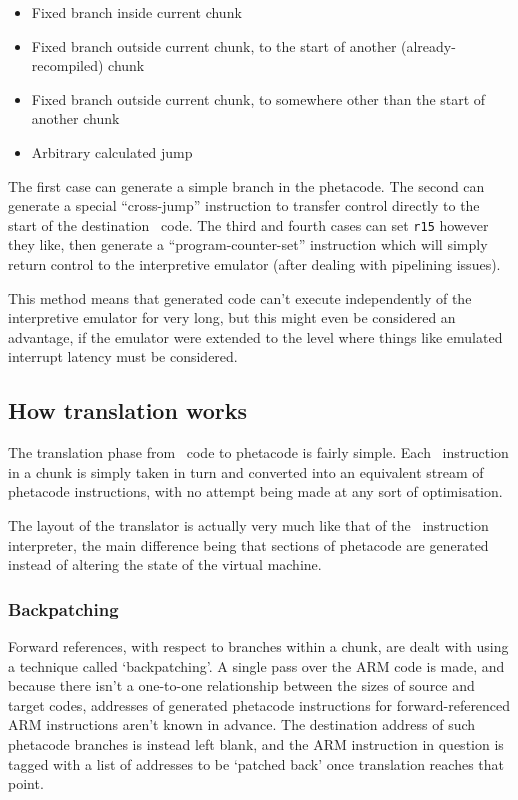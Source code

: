 \begin{itemize}

\item Fixed branch inside current chunk
\item Fixed branch outside current chunk, to the start of another (already-recompiled) chunk
\item Fixed branch outside current chunk, to somewhere other than the start of another chunk
\item Arbitrary calculated jump

\end{itemize}

The first case can generate a simple branch in the phetacode. The second can generate a special ``cross-jump'' instruction to transfer control directly to the start of the destination \ia\ code. The third and fourth cases can set {\tt r15} however they like, then generate a ``program-counter-set'' instruction which will simply return control to the interpretive emulator (after dealing with pipelining issues).

This method means that generated code can't execute independently of the interpretive emulator for very long, but this might even be considered an advantage, if the emulator were extended to the level where things like emulated interrupt latency must be considered.

\subsection{How translation works}

The translation phase from \arm\ code to phetacode is fairly simple. Each \arm\ instruction in a chunk is simply taken in turn and converted into an equivalent stream of phetacode instructions, with no attempt being made at any sort of optimisation.

The layout of the translator is actually very much like that of the \arm\ instruction interpreter, the main difference being that sections of phetacode are generated instead of altering the state of the virtual machine.

\subsubsection{Backpatching}

Forward references, with respect to branches within a chunk, are dealt with using a technique called `backpatching'. A single pass over the ARM code is made, and because there isn't a one-to-one relationship between the sizes of source and target codes, addresses of generated phetacode instructions for forward-referenced ARM instructions aren't known in advance. The destination address of such phetacode branches is instead left blank, and the ARM instruction in question is tagged with a list of addresses to be `patched back' once translation reaches that point.

